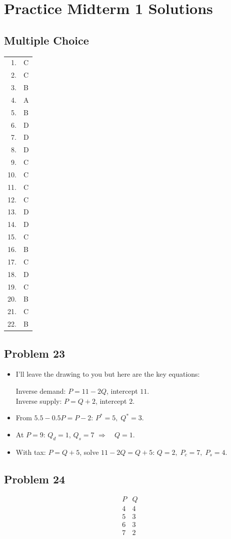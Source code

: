 \documentclass[12pt]{article}
\begin{document}
\section*{Practice Midterm 1 Solutions}
\noindent

\noindent
\vspace{1em}

\subsection*{Multiple Choice}

\begin{tabular}{r l}
    1.  & C \\
    2.  & C \\
    3.  & B \\
    4.  & A \\
    5.  & B \\
    6.  & D \\
    7.  & D \\
    8.  & D \\
    9.  & C \\
    10. & C \\
    11. & C \\
    12. & C \\
    13. & D \\
    14. & D \\
    15. & C \\
    16. & B \\
    17. & C \\
    18. & D \\
    19. & C \\
    20. & B \\
    21. & C \\
    22. & B \\
\end{tabular}

\subsection*{Problem 23}
\begin{itemize}
    \item[(a)] I'll leave the drawing to you but here are  the key equations:

          Inverse demand: $P = 11 - 2Q$, intercept $11$. \\
          Inverse supply: $P = Q + 2$, intercept $2$.
    \item[(b)] From $5.5 - 0.5P = P - 2$: \quad $\boxed{P^* = 5}, \; Q^* = 3$.
    \item[(c)] At $P = 9$: $Q_d=1$, $Q_s=7$ \quad $\Rightarrow \quad \boxed{Q=1}$.
    \item[(d)] With tax: $P = Q + 5$, solve $11 - 2Q = Q + 5$: \quad $\boxed{Q=2}, \; P_c=7, \; P_s=4$.
\end{itemize}

\subsection*{Problem 24}
\[
    \begin{array}{c|c}
        P & Q         \\
        \hline
        4 & \boxed{4} \\
        5 & \boxed{3} \\
        6 & \boxed{3} \\
        7 & \boxed{2} \\
    \end{array}
\]
\end{document}

